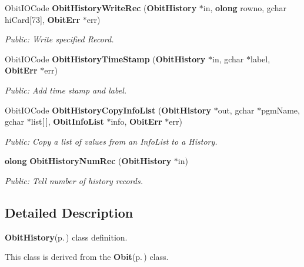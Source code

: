 \begin{CompactItemize}
Obit\-IOCode {\bf Obit\-History\-Write\-Rec} ({\bf Obit\-History} $\ast$in, {\bf olong} rowno, gchar hi\-Card[73], {\bf Obit\-Err} $\ast$err)
\begin{CompactList}\small\item\em Public: Write specified Record. \item\end{CompactList}\item 
Obit\-IOCode {\bf Obit\-History\-Time\-Stamp} ({\bf Obit\-History} $\ast$in, gchar $\ast$label, {\bf Obit\-Err} $\ast$err)
\begin{CompactList}\small\item\em Public: Add time stamp and label. \item\end{CompactList}\item 
Obit\-IOCode {\bf Obit\-History\-Copy\-Info\-List} ({\bf Obit\-History} $\ast$out, gchar $\ast$pgm\-Name, gchar $\ast$list[$\,$], {\bf Obit\-Info\-List} $\ast$info, {\bf Obit\-Err} $\ast$err)
\begin{CompactList}\small\item\em Public: Copy a list of values from an Info\-List to a History. \item\end{CompactList}\item 
{\bf olong} {\bf Obit\-History\-Num\-Rec} ({\bf Obit\-History} $\ast$in)
\begin{CompactList}\small\item\em Public: Tell number of history records. \item\end{CompactList}\end{CompactItemize}


\subsection{Detailed Description}
{\bf Obit\-History}{\rm (p.\,\pageref{structObitHistory})} class definition. 

This class is derived from the {\bf Obit}{\rm (p.\,\pageref{structObit})} class.

